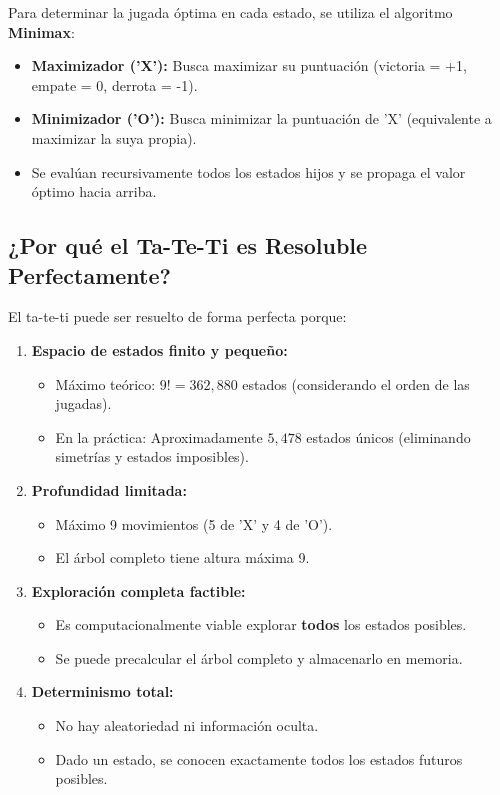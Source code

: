 \documentclass[12pt]{article}
\begin{document}
Para determinar la jugada óptima en cada estado, se utiliza el algoritmo \textbf{Minimax}:

\begin{itemize}[leftmargin=2em]
    \item \textbf{Maximizador ('X'):} Busca maximizar su puntuación (victoria = +1, empate = 0, derrota = -1).
    \item \textbf{Minimizador ('O'):} Busca minimizar la puntuación de 'X' (equivalente a maximizar la suya propia).
    \item Se evalúan recursivamente todos los estados hijos y se propaga el valor óptimo hacia arriba.
\end{itemize}

\newpage
\subsection*{¿Por qué el Ta-Te-Ti es Resoluble Perfectamente?}

El ta-te-ti puede ser resuelto de forma perfecta porque:

\begin{enumerate}[leftmargin=2em]
    \item \textbf{Espacio de estados finito y pequeño:}
    \begin{itemize}
        \item Máximo teórico: $9! = 362{,}880$ estados (considerando el orden de las jugadas).
        \item En la práctica: Aproximadamente $5{,}478$ estados únicos (eliminando simetrías y estados imposibles).
    \end{itemize}
    
    \item \textbf{Profundidad limitada:}
    \begin{itemize}
        \item Máximo 9 movimientos (5 de 'X' y 4 de 'O').
        \item El árbol completo tiene altura máxima 9.
    \end{itemize}
    
    \item \textbf{Exploración completa factible:}
    \begin{itemize}
        \item Es computacionalmente viable explorar \textbf{todos} los estados posibles.
        \item Se puede precalcular el árbol completo y almacenarlo en memoria.
    \end{itemize}
    
    \item \textbf{Determinismo total:}
    \begin{itemize}
        \item No hay aleatoriedad ni información oculta.
        \item Dado un estado, se conocen exactamente todos los estados futuros posibles.
    \end{itemize}
\end{enumerate}
\end{document}
